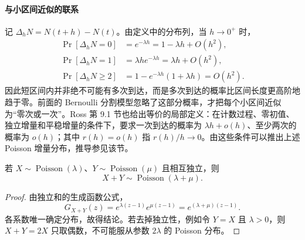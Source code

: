 \documentclass[lang=cn,a4paper,fontset=none,zihao=false,10pt,openany,twoside]{beautybook}
\numberwithin{algorithm}{chapter}
\begin{document}
\paragraph{与小区间近似的联系}
记 $\Delta_hN=N(t+h)-N(t)$。由定义中的分布列，当 $h\to0^+$ 时，
\begin{align*}
 \Pr[\Delta_hN=0]&=e^{-\lambda h}=1-\lambda h+O(h^2),\\
 \Pr[\Delta_hN=1]&=\lambda h e^{-\lambda h}=\lambda h+O(h^2),\\
 \Pr[\Delta_hN\ge2]&=1-e^{-\lambda h}(1+\lambda h)=O(h^2).
\end{align*}
因此短区间内并非绝不可能有多次到达，而是多次到达的概率比区间长度更高阶地趋于零。前面的 Bernoulli 分割模型忽略了这部分概率，才把每个小区间近似为“零次或一次”。Ross 第 9.1 节也给出等价的局部定义：在计数过程、零初值、独立增量和平稳增量的条件下，要求一次到达的概率为 $\lambda h+o(h)$、至少两次的概率为 $o(h)$；其中 $r(h)=o(h)$ 指 $r(h)/h\to0$。由这些条件可以推出上述 Poisson 增量分布，推导参见该节。

\begin{corollary}\label{cor:poisson-additivity}
若 $X\sim\operatorname{Poisson}(\lambda)$、$Y\sim\operatorname{Poisson}(\mu)$ 且相互独立，则
\[
 X+Y\sim\operatorname{Poisson}(\lambda+\mu).
\]
\end{corollary}
\begin{proof}
由独立和的生成函数公式，
\[
 G_{X+Y}(z)=e^{\lambda(z-1)}e^{\mu(z-1)}=e^{(\lambda+\mu)(z-1)}.
\]
各系数唯一确定分布，故得结论。若去掉独立性，例如令 $Y=X$ 且 $\lambda>0$，则 $X+Y=2X$ 只取偶数，不可能服从参数 $2\lambda$ 的 Poisson 分布。
\end{proof}



\FloatBarrier
\end{document}
